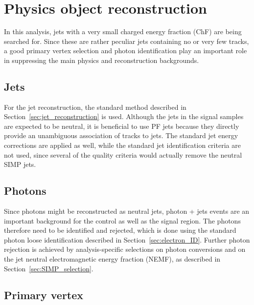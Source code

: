 \section{Physics object reconstruction} 
\label{sec:SIMP_reconstruction}

In this analysis, jets with a very small charged energy fraction (ChF) are being searched for. Since these are rather peculiar jets containing no or very few tracks, a good primary vertex selection and photon identification play an important role in suppressing the main physics and reconstruction backgrounds.

\subsection{Jets}

For the jet reconstruction, the standard method described in Section~\ref{sec:jet_reconstruction} is used. Although the jets in the signal samples are expected to be neutral, it is beneficial to use \ac{PF} jets because they directly provide an unambiguous association of tracks to jets. The standard jet energy corrections are applied as well, while the standard jet identification criteria are not used, since several of the quality criteria would actually remove the neutral \ac{SIMP} jets.

\subsection{Photons}

Since photons might be reconstructed as neutral jets, photon + jets events are an important background for the control as well as the signal region. The photons therefore need to be identified and rejected, which is done using the standard photon loose identification described in Section~\ref{sec:electron_ID}. Further photon rejection is achieved by analysis-specific selections on photon conversions and on the jet neutral electromagnetic energy fraction (NEMF), as described in Section~\ref{sec:SIMP_selection}.

\subsection{Primary vertex}


